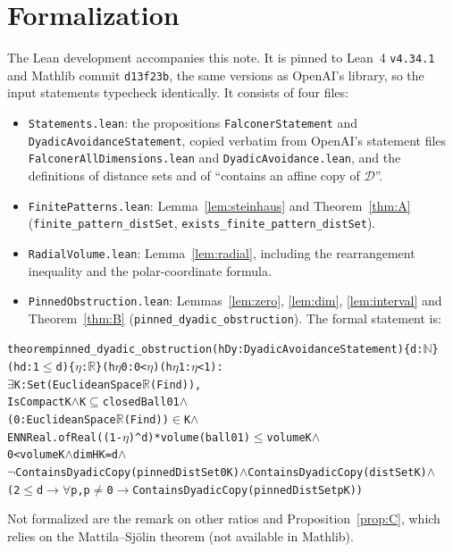 \documentclass[11pt]{amsart}
\theoremstyle{definition}
\theoremstyle{remark}
\newcommand{\Dy}{\mathcal{D}}
\begin{document}
\section{Formalization}\label{sec:lean}
\begin{sloppypar}

The Lean development accompanies this note. It is pinned to Lean~4 \texttt{v4.34.1} and
Mathlib commit \texttt{d13f23b}, the same versions as OpenAI's library, so the input statements
typecheck identically. It consists of four files:
\begin{itemize}[leftmargin=*]
\item \texttt{Statements.lean}: the propositions \texttt{FalconerStatement} and
  \texttt{DyadicAvoidanceStatement}, copied verbatim from OpenAI's statement files
  \texttt{FalconerAllDimensions.lean} and \texttt{DyadicAvoidance.lean}, and the definitions of distance
  sets and of ``contains an affine copy of $\Dy$''.
\item \texttt{FinitePatterns.lean}: Lemma~\ref{lem:steinhaus} and Theorem~\ref{thm:A}
  (\texttt{finite\_pattern\_distSet}, \texttt{exists\_finite\_pattern\_distSet}).
\item \texttt{RadialVolume.lean}: Lemma~\ref{lem:radial}, including the rearrangement inequality
  and the polar-coordinate formula.
\item \texttt{PinnedObstruction.lean}: Lemmas~\ref{lem:zero}, \ref{lem:dim}, \ref{lem:interval}
  and Theorem~\ref{thm:B} (\texttt{pinned\_dyadic\_obstruction}). The formal statement is:
\end{itemize}
\begin{alltt}\footnotesize
theorem pinned_dyadic_obstruction (hDy : DyadicAvoidanceStatement) \{d : \(\mathbb{N}\)\}
    (hd : 1 \(\le\) d) \{\(\eta\) : \(\mathbb{R}\)\} (h\(\eta\)0 : 0 < \(\eta\)) (h\(\eta\)1 : \(\eta\) < 1) :
    \(\exists\) K : Set (EuclideanSpace \(\mathbb{R}\) (Fin d)),
      IsCompact K \(\wedge\) K \(\subseteq\) closedBall 0 1 \(\wedge\)
      (0 : EuclideanSpace \(\mathbb{R}\) (Fin d)) \(\in\) K \(\wedge\)
      ENNReal.ofReal ((1 - \(\eta\)) ^ d) * volume (ball 0 1) \(\le\) volume K \(\wedge\)
      0 < volume K \(\wedge\) dimH K = d \(\wedge\)
      \(\neg\) ContainsDyadicCopy (pinnedDistSet 0 K) \(\wedge\) ContainsDyadicCopy (distSet K) \(\wedge\)
      (2 \(\le\) d \(\to\) \(\forall\) p, p \(\ne\) 0 \(\to\) ContainsDyadicCopy (pinnedDistSet p K))
\end{alltt}
Not formalized are the remark on other ratios and Proposition~\ref{prop:C}, which relies on the
Mattila--Sj\"olin theorem (not available in Mathlib).


\end{sloppypar}
\end{document}
